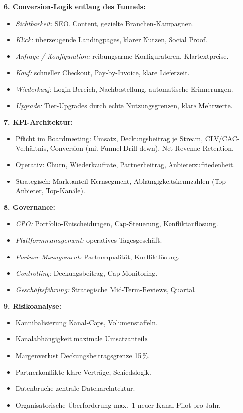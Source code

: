 \documentclass[11pt,a4paper,oneside]{article}
\begin{document}
\begin{loesungbox}
\textbf{6. Conversion-Logik entlang des Funnels:}
\begin{itemize}
  \item \emph{Sichtbarkeit:} SEO, Content, gezielte Branchen-Kampagnen.
  \item \emph{Klick:} überzeugende Landingpages, klarer Nutzen, Social Proof.
  \item \emph{Anfrage / Konfiguration:} reibungsarme Konfiguratoren, Klartextpreise.
  \item \emph{Kauf:} schneller Checkout, Pay-by-Invoice, klare Lieferzeit.
  \item \emph{Wiederkauf:} Login-Bereich, Nachbestellung, automatische Erinnerungen.
  \item \emph{Upgrade:} Tier-Upgrades durch echte Nutzungsgrenzen, klare Mehrwerte.
\end{itemize}

\textbf{7. KPI-Architektur:}
\begin{itemize}
  \item Pflicht im Boardmeeting: Umsatz, Deckungsbeitrag je Stream, CLV/CAC-Verhältnis, Conversion (mit Funnel-Drill-down), Net Revenue Retention.
  \item Operativ: Churn, Wiederkaufrate, Partnerbeitrag, Anbieterzufriedenheit.
  \item Strategisch: Marktanteil Kernsegment, Abhängigkeitskennzahlen (Top-Anbieter, Top-Kanäle).
\end{itemize}

\textbf{8. Governance:}
\begin{itemize}
  \item \emph{CRO:} Portfolio-Entscheidungen, Cap-Steuerung, Konfliktauflösung.
  \item \emph{Plattformmanagement:} operatives Tagesgeschäft.
  \item \emph{Partner Management:} Partnerqualität, Konfliktlösung.
  \item \emph{Controlling:} Deckungsbeitrag, Cap-Monitoring.
  \item \emph{Geschäftsführung:} Strategische Mid-Term-Reviews, Quartal.
\end{itemize}

\textbf{9. Risikoanalyse:}
\begin{itemize}
  \item Kannibalisierung \textrightarrow{} Kanal-Caps, Volumenstaffeln.
  \item Kanalabhängigkeit \textrightarrow{} maximale Umsatzanteile.
  \item Margenverlust \textrightarrow{} Deckungsbeitragsgrenze 15\,\%.
  \item Partnerkonflikte \textrightarrow{} klare Verträge, Schiedslogik.
  \item Datenbrüche \textrightarrow{} zentrale Datenarchitektur.
  \item Organisatorische Überforderung \textrightarrow{} max.\ 1 neuer Kanal-Pilot pro Jahr.
\end{itemize}


\end{loesungbox}
\end{document}
